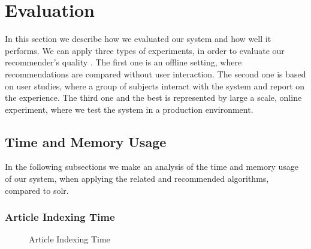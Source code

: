 \section{Evaluation} 
\label{sec:evaluation}
In this section we describe how we evaluated our system and how well it performs.
We can apply three types of experiments, in order to evaluate our recommender's quality \cite{evaluate-recommender-system}. The first one is an offline setting, where recommendations are compared without user interaction. The second one is based on user studies, where a group of subjects interact with the system and report on the experience. The third one and the best is represented by large a scale, online experiment, where we test the system in a production environment.

\subsection{Time and Memory Usage}
\label{sec:time-memory-usage}
In the following subsections we make an analysis of the time and memory usage of our system, when applying the related and recommended algorithms, compared to solr. 

\subsubsection{Article Indexing Time}
\label{sec:article-indexing-time}

\begin{figure}[h]
\centering
\caption{Article Indexing Time}
\label{tikz}
\end{figure}

